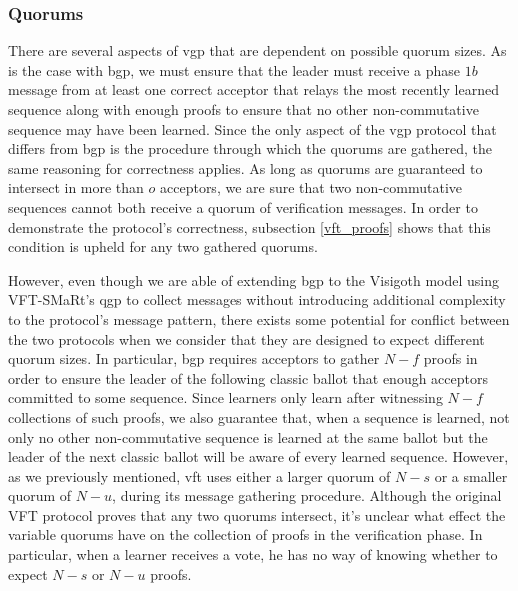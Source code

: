 \subsubsection{Quorums}
There are several aspects of \acrshort{vgp} that are dependent on possible quorum sizes. As is the case with \acrshort{bgp}, we must ensure that the leader must receive a phase $1b$ message from at least one correct acceptor that relays the most recently learned sequence along with enough proofs to ensure that no other non-commutative sequence may have been learned. Since the only aspect of the \acrshort{vgp} protocol that differs from \acrshort{bgp} is the procedure through which the quorums are gathered, the same reasoning for correctness applies. As long as quorums are guaranteed to intersect in more than $o$ acceptors, we are sure that two non-commutative sequences cannot both receive a quorum of verification messages. In order to demonstrate the protocol's correctness, subsection \ref{vft_proofs} shows that this condition is upheld for any two gathered quorums. \par
However, even though we are able of extending \acrshort{bgp} to the Visigoth model using VFT-SMaRt's \acrshort{qgp} to collect messages without introducing additional complexity to the protocol's message pattern, there exists some potential for conflict between the two protocols when we consider that they are designed to expect different quorum sizes. In particular, \acrshort{bgp} requires acceptors to gather $N-f$ proofs in order to ensure the leader of the following classic ballot that enough acceptors committed to some sequence. Since learners only learn after witnessing $N-f$ collections of such proofs, we also guarantee that, when a sequence is learned, not only no other non-commutative sequence is learned at the same ballot but the leader of the next classic ballot will be aware of every learned sequence. However, as we previously mentioned, \acrshort{vft} uses either a larger quorum of $N-s$ or a smaller quorum of $N-u$, during its message gathering procedure. Although the original VFT protocol proves that any two quorums intersect, it's unclear what effect the variable quorums have on the collection of proofs in the verification phase. In particular, when a learner receives a vote, he has no way of knowing whether to expect $N-s$ or $N-u$ proofs. \par 
